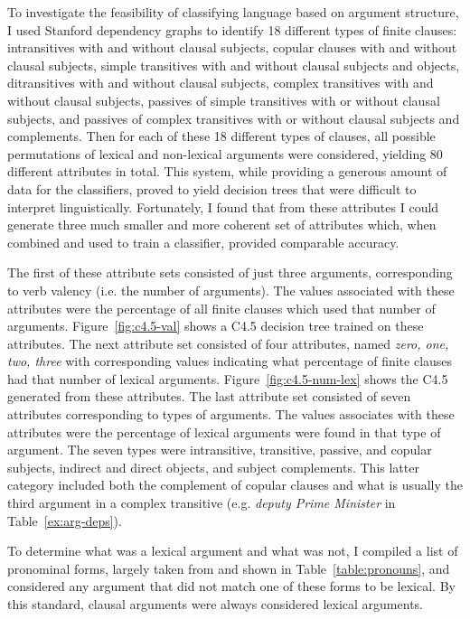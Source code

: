 \documentclass[main.tex]{subfiles}
\begin{document}
To investigate the feasibility of classifying language based on argument structure, I used Stanford dependency graphs to identify 18 different types of finite clauses: intransitives with and without clausal subjects, copular clauses with and without clausal subjects, simple transitives with and without clausal subjects and objects, ditransitives with and without clausal subjects, complex transitives with and without clausal subjects, passives of simple transitives with or without clausal subjects, and passives of complex transitives with or without clausal subjects and complements. Then for each of these 18 different types of clauses, all possible permutations of lexical and non-lexical arguments were considered, yielding 80 different attributes in total. This system, while providing a generous amount of data for the classifiers, proved to yield decision trees that were difficult to interpret linguistically. Fortunately, I found that from these attributes I could generate three much smaller and more coherent set of attributes which, when combined and used to train a classifier, provided comparable accuracy.

The first of these attribute sets consisted of just three arguments, corresponding to verb valency (i.e. the number of arguments). The values associated with these attributes were the percentage of all finite clauses which used that number of arguments. Figure~\ref{fig:c4.5-val} shows a C4.5 decision tree trained on these attributes. The next attribute set consisted of four attributes, named \textit{zero, one, two, three} with corresponding values indicating what percentage of finite clauses had that number of lexical arguments. Figure~\ref{fig:c4.5-num-lex} shows the C4.5 generated from these attributes. The last attribute set consisted of seven attributes corresponding to types of arguments. The values associates with these attributes were the percentage of lexical arguments were found in that type of argument. The seven types were intransitive, transitive, passive, and copular subjects, indirect and direct objects, and subject complements. This latter category included both the complement of copular clauses and what is usually the third argument in a complex transitive (e.g. \textit{deputy Prime Minister} in Table~\ref{ex:arg-deps}).

To determine what was a lexical argument and what was not, I compiled a list of pronominal forms, largely taken from \citet[Ch. 16]{celce-murcia:1999} and shown in Table~\ref{table:pronouns}, and considered any argument that did not match one of these forms to be lexical. By this standard, clausal arguments were always considered lexical arguments. 
\end{document}
